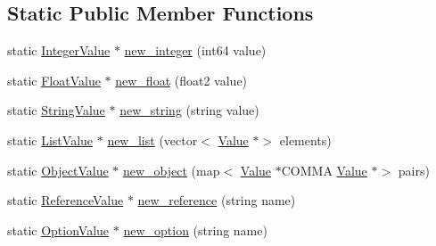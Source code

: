 \subsection*{Static Public Member Functions}
\begin{DoxyCompactItemize}
\item 
static \hyperlink{classeviir_1_1IntegerValue}{Integer\+Value} $\ast$ \hyperlink{classeviir_1_1Value_a4ca31d3ac1118e0d7c055f76b1b79316}{new\+\_\+integer} (int64 value)
\item 
static \hyperlink{classeviir_1_1FloatValue}{Float\+Value} $\ast$ \hyperlink{classeviir_1_1Value_ad3079cc26bb4f64b00b88d9c6e98bad2}{new\+\_\+float} (float2 value)
\item 
static \hyperlink{classeviir_1_1StringValue}{String\+Value} $\ast$ \hyperlink{classeviir_1_1Value_a78aff0da1e6cf71d2ecb26117b7479a8}{new\+\_\+string} (string value)
\item 
static \hyperlink{classeviir_1_1ListValue}{List\+Value} $\ast$ \hyperlink{classeviir_1_1Value_a285f3fcf2b610578bbf8c9d02460cb3f}{new\+\_\+list} (vector$<$ \hyperlink{classeviir_1_1Value}{Value} $\ast$$>$ elements)
\item 
static \hyperlink{classeviir_1_1ObjectValue}{Object\+Value} $\ast$ \hyperlink{classeviir_1_1Value_a876b8c35f35e3fe2c28fcac56a69ee3d}{new\+\_\+object} (map$<$ \hyperlink{classeviir_1_1Value}{Value} $\ast$C\+O\+M\+MA \hyperlink{classeviir_1_1Value}{Value} $\ast$$>$ pairs)
\item 
static \hyperlink{classeviir_1_1ReferenceValue}{Reference\+Value} $\ast$ \hyperlink{classeviir_1_1Value_ae74ab52631f7ca2289a3b7c66f36a2c7}{new\+\_\+reference} (string name)
\item 
static \hyperlink{classeviir_1_1OptionValue}{Option\+Value} $\ast$ \hyperlink{classeviir_1_1Value_ab52c6c549453d60104515e2f8e68967a}{new\+\_\+option} (string name)
\end{DoxyCompactItemize}

